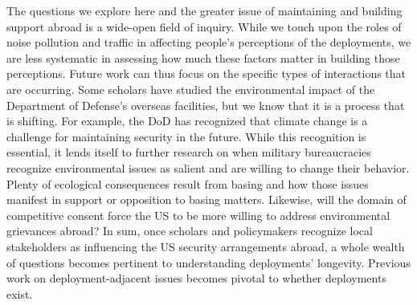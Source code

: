 The questions we explore here and the greater issue of maintaining and building support abroad is a wide-open field of inquiry. While we touch upon the roles of noise pollution and traffic in affecting people's perceptions of the deployments, we are less systematic in assessing how much these factors matter in building those perceptions. Future work can thus focus on the specific types of interactions that are occurring. Some scholars have studied the environmental impact of the Department of Defense's overseas facilities, but we know that it is a process that is shifting. For example, the DoD has recognized that climate change is a challenge for maintaining security in the future. While this recognition is essential, it lends itself to further research on when military bureaucracies recognize environmental issues as salient and are willing to change their behavior. Plenty of ecological consequences result from basing and how those issues manifest in support or opposition to basing matters. Likewise, will the domain of competitive consent force the US to be more willing to address environmental grievances abroad? In sum, once scholars and policymakers recognize local stakeholders as influencing the US security arrangements abroad, a whole wealth of questions becomes pertinent to understanding deployments' longevity. Previous work on deployment-adjacent issues becomes pivotal to whether deployments exist. %

